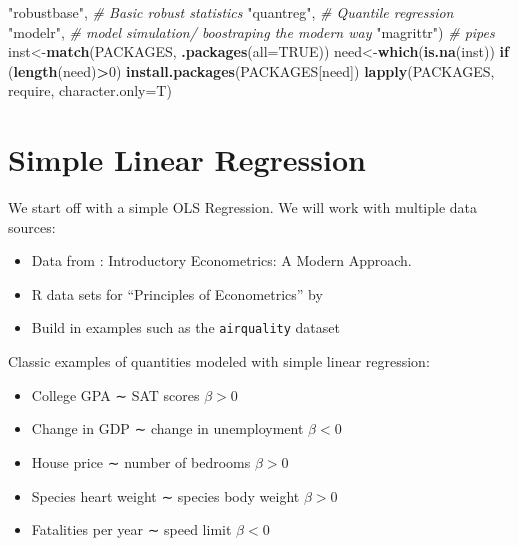 \documentclass[]{book}
\newenvironment{Shaded}{\begin{snugshade}}{\end{snugshade}}
\newcommand{\CommentTok}[1]{\textcolor[rgb]{0.56,0.35,0.01}{\textit{#1}}}
\newcommand{\ControlFlowTok}[1]{\textcolor[rgb]{0.13,0.29,0.53}{\textbf{#1}}}
\newcommand{\DataTypeTok}[1]{\textcolor[rgb]{0.13,0.29,0.53}{#1}}
\newcommand{\DecValTok}[1]{\textcolor[rgb]{0.00,0.00,0.81}{#1}}
\newcommand{\KeywordTok}[1]{\textcolor[rgb]{0.13,0.29,0.53}{\textbf{#1}}}
\newcommand{\NormalTok}[1]{#1}
\newcommand{\OperatorTok}[1]{\textcolor[rgb]{0.81,0.36,0.00}{\textbf{#1}}}
\newcommand{\OtherTok}[1]{\textcolor[rgb]{0.56,0.35,0.01}{#1}}
\newcommand{\StringTok}[1]{\textcolor[rgb]{0.31,0.60,0.02}{#1}}
\providecommand{\tightlist}{%
  \setlength{\itemsep}{0pt}\setlength{\parskip}{0pt}}
\begin{document}
\begin{Shaded}
\begin{Highlighting}[]
            \StringTok{"robustbase"}\NormalTok{, }\CommentTok{# Basic robust statistics}
            \StringTok{"quantreg"}\NormalTok{, }\CommentTok{# Quantile regression}
            \StringTok{"modelr"}\NormalTok{, }\CommentTok{# model simulation/ boostraping the modern way}
            \StringTok{"magrittr"}\NormalTok{) }\CommentTok{#  pipes}
\NormalTok{inst<-}\KeywordTok{match}\NormalTok{(PACKAGES, }\KeywordTok{.packages}\NormalTok{(}\DataTypeTok{all=}\OtherTok{TRUE}\NormalTok{))}
\NormalTok{need<-}\KeywordTok{which}\NormalTok{(}\KeywordTok{is.na}\NormalTok{(inst))}
\ControlFlowTok{if}\NormalTok{ (}\KeywordTok{length}\NormalTok{(need)}\OperatorTok{>}\DecValTok{0}\NormalTok{) }\KeywordTok{install.packages}\NormalTok{(PACKAGES[need])}
\KeywordTok{lapply}\NormalTok{(PACKAGES, require, }\DataTypeTok{character.only=}\NormalTok{T)}
\end{Highlighting}
\end{Shaded}

\hypertarget{simple-linear-regression}{%
\section{Simple Linear Regression}\label{simple-linear-regression}}

We start off with a simple OLS Regression. We will work with multiple
data sources:

\begin{itemize}
\tightlist
\item
  Data from \citet{wooldridge2015introductory} : Introductory
  Econometrics: A Modern Approach.
\item
  R data sets for ``Principles of Econometrics'' by
  \citet{hill2008principles}
\item
  Build in examples such as the \texttt{airquality} dataset
\end{itemize}

Classic examples of quantities modeled with simple linear regression:

\begin{itemize}
\tightlist
\item
  College GPA ∼ SAT scores \(\beta > 0\)
\item
  Change in GDP ∼ change in unemployment \(\beta < 0\)
\item
  House price ∼ number of bedrooms \(\beta > 0\)
\item
  Species heart weight ∼ species body weight \(\beta > 0\)
\item
  Fatalities per year ∼ speed limit \(\beta < 0\)
\end{itemize}
\end{document}
